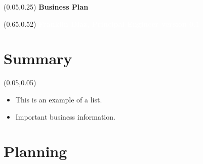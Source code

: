 \documentclass[aspectratio=169]{beamer}
\begin{document}
\begin{frame}
    \setlength{\TPHorizModule}{\textwidth}
    \setlength{\TPVertModule}{\textwidth}
    \begin{textblock}{0.5}(0.05,0.25)
      \bfseries\Huge{Business Plan}
    \end{textblock}
    \begin{textblock}{0.5}(0.65,0.52)
        \bfseries\textcolor{white}{Franklin Diaz, Principal Engineer version 0.1}
    \end{textblock}
\end{frame}

\section{Summary}

\begin{frame}{}
    \setlength{\TPHorizModule}{\textwidth}
    \setlength{\TPVertModule}{\textwidth}
    \begin{textblock}{0.74}(0.05,0.05)
        \bfseries\large{}
    \end{textblock}
    \begin{itemize}
        \item This is an example of a list.
        \item Important business information.
    \end{itemize}
\end{frame}

\section{Planning}

\end{document}
